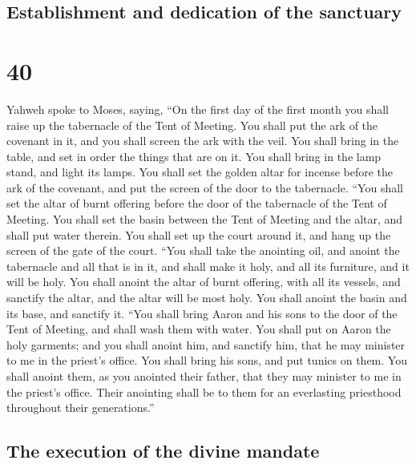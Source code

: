 \hypertarget{establishment-and-dedication-of-the-sanctuary}{%
\subsection{Establishment and dedication of the
sanctuary}\label{establishment-and-dedication-of-the-sanctuary}}

\hypertarget{section-39}{%
\section{40}\label{section-39}}

 Yahweh spoke to Moses, saying,  ``On the
first day of the first month you shall raise up the tabernacle of the
Tent of Meeting.  You shall put the ark of the covenant in
it, and you shall screen the ark with the veil.  You shall
bring in the table, and set in order the things that are on it. You
shall bring in the lamp stand, and light its lamps.  You
shall set the golden altar for incense before the ark of the covenant,
and put the screen of the door to the tabernacle.  ``You
shall set the altar of burnt offering before the door of the tabernacle
of the Tent of Meeting.  You shall set the basin between
the Tent of Meeting and the altar, and shall put water therein.
 You shall set up the court around it, and hang up the
screen of the gate of the court.  ``You shall take the
anointing oil, and anoint the tabernacle and all that is in it, and
shall make it holy, and all its furniture, and it will be holy.
 You shall anoint the altar of burnt offering, with all
its vessels, and sanctify the altar, and the altar will be most holy.
 You shall anoint the basin and its base, and sanctify
it.  ``You shall bring Aaron and his sons to the door of
the Tent of Meeting, and shall wash them with water.  You
shall put on Aaron the holy garments; and you shall anoint him, and
sanctify him, that he may minister to me in the priest's office.
 You shall bring his sons, and put tunics on them.
 You shall anoint them, as you anointed their father,
that they may minister to me in the priest's office. Their anointing
shall be to them for an everlasting priesthood throughout their
generations.''

\hypertarget{the-execution-of-the-divine-mandate}{%
\subsection{The execution of the divine
mandate}\label{the-execution-of-the-divine-mandate}}

